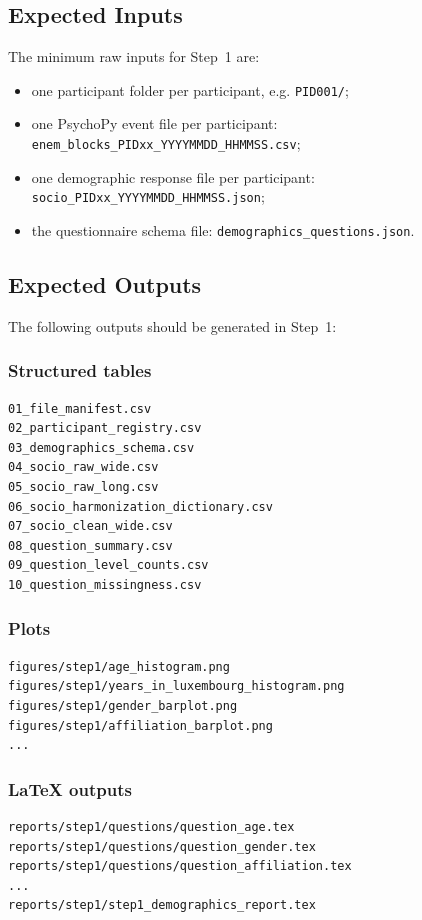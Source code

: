 \subsection{Expected Inputs}
The minimum raw inputs for Step~1 are:
\begin{itemize}
    \item one participant folder per participant, e.g. \texttt{PID001/};
    \item one PsychoPy event file per participant:
    \texttt{enem\_blocks\_PIDxx\_YYYYMMDD\_HHMMSS.csv};
    \item one demographic response file per participant:
    \texttt{socio\_PIDxx\_YYYYMMDD\_HHMMSS.json};
    \item the questionnaire schema file:
    \texttt{demographics\_questions.json}.
\end{itemize}

\subsection{Expected Outputs}
The following outputs should be generated in Step~1:

\subsubsection*{Structured tables}
\begin{verbatim}
01_file_manifest.csv
02_participant_registry.csv
03_demographics_schema.csv
04_socio_raw_wide.csv
05_socio_raw_long.csv
06_socio_harmonization_dictionary.csv
07_socio_clean_wide.csv
08_question_summary.csv
09_question_level_counts.csv
10_question_missingness.csv
\end{verbatim}

\subsubsection*{Plots}
\begin{verbatim}
figures/step1/age_histogram.png
figures/step1/years_in_luxembourg_histogram.png
figures/step1/gender_barplot.png
figures/step1/affiliation_barplot.png
...
\end{verbatim}

\subsubsection*{\LaTeX{} outputs}
\begin{verbatim}
reports/step1/questions/question_age.tex
reports/step1/questions/question_gender.tex
reports/step1/questions/question_affiliation.tex
...
reports/step1/step1_demographics_report.tex
\end{verbatim}

